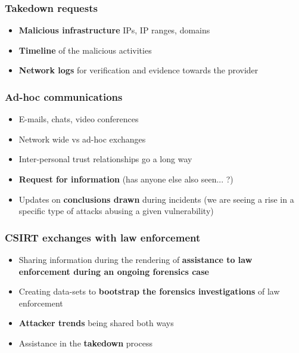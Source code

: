 \begin{frame}
    \frametitle{Takedown requests}
    \begin{itemize}
        \item {\bf Malicious infrastructure} IPs, IP ranges, domains
        \item {\bf Timeline} of the malicious activities
        \item {\bf Network logs} for verification and evidence towards the provider
    \end{itemize}

\end{frame}

\begin{frame}
    \frametitle{Ad-hoc communications}
    \begin{itemize}
        \item E-mails, chats, video conferences
        \item Network wide vs ad-hoc exchanges
        \item Inter-personal trust relationships go a long way 
        \item {\bf Request for information} (has anyone else also seen... ?)
        \item Updates on {\bf conclusions drawn} during incidents (we are seeing a rise in a specific type of attacks abusing a given vulnerability)
    \end{itemize}

\end{frame}

\begin{frame}
    \frametitle{CSIRT exchanges with law enforcement}
    \begin{itemize}
        \item Sharing information during the rendering of {\bf assistance to law enforcement during an ongoing forensics case}
        \item Creating data-sets to {\bf bootstrap the forensics investigations} of law enforcement
        \item {\bf Attacker trends} being shared both ways
        \item Assistance in the {\bf takedown} process
    \end{itemize}

\end{frame}

